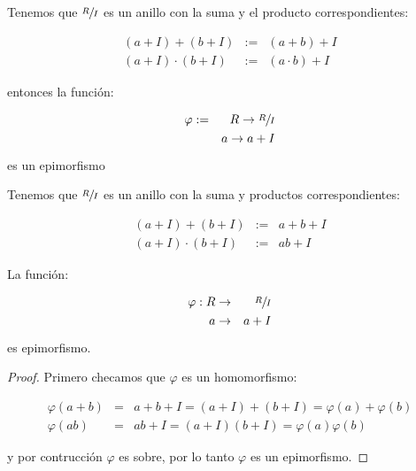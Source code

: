     \begin{observacion}
        Tenemos que $\sfrac{R}{I}$ es un anillo con la suma y el producto correspondientes:

        \begin{eqnarray}
            (a + I) + (b + I) & := & (a + b) + I \\
            (a + I) \cdot (b + I) & := & (a \cdot b) + I
        \end{eqnarray}

        entonces la función:

        \begin{eqnarray*}
            \varphi & := & R \to \sfrac{R}{I} \\
             & & a \to a + I
        \end{eqnarray*}

        es un epimorfismo
    \end{observacion}

    \begin{observacion}
        Tenemos que $\sfrac{R}{I}$ es un anillo con la suma y productos correspondientes:

        \begin{eqnarray}
            (a + I) + (b + I) & := & a + b + I \\
            (a + I) \cdot (b + I) & := & ab + I
        \end{eqnarray}

        La función:

        \begin{eqnarray}
            \varphi : R & \to & \sfrac{R}{I} \\
            a & \to & a + I
        \end{eqnarray}

        es epimorfismo.
    \end{observacion}

    \begin{proof}
        Primero checamos que $\varphi$ es un homomorfismo:

        \begin{eqnarray*}
            \varphi(a+b) & = & a+b+I = (a+I) + (b+I) = \varphi(a) + \varphi(b) \\
            \varphi(ab) & = & ab+I =(a+I)(b+I) = \varphi(a) \varphi(b)
        \end{eqnarray*}

        y por contrucción $\varphi$ es sobre, por lo tanto $\varphi$ es un epimorfismo.
    \end{proof}

